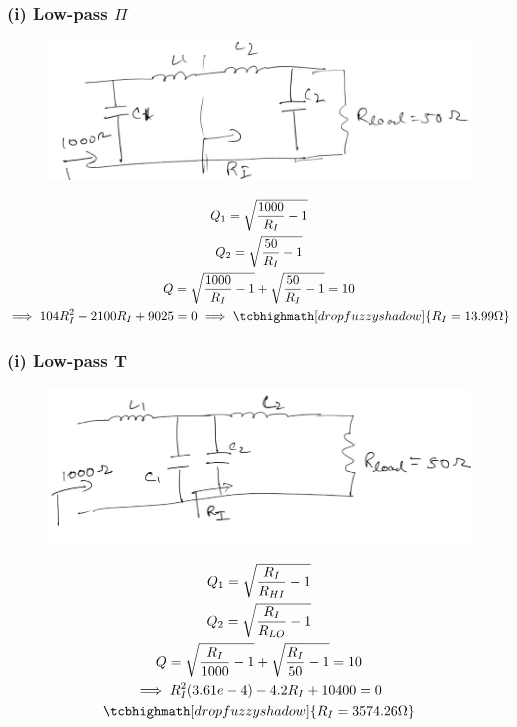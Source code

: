 \documentclass{article}
\begin{document}
\subsubsection*{(i) Low-pass $\Pi$}
\begin{figure}[H]
	\includegraphics[scale=0.4]{./figs/q2_bii.png}
\end{figure}
\begin{gather}
	Q_1 = \sqrt{\frac{1000}{R_{I}}-1}\\
	Q_2 = \sqrt{\frac{50}{R_{I}}-1}\\
	Q = \sqrt{\frac{1000}{R_{I}}-1} + \sqrt{\frac{50}{R_{I}}-1} = 10\\
	\implies 104R_I^2 -2100R_I + 9025 = 0
	\implies \tcbhighmath[drop fuzzy shadow]{R_I = 13.99 \si{\ohm}}
\end{gather}

\subsubsection*{(i) Low-pass T}
\begin{figure}[H]
	\includegraphics[scale=0.4]{./figs/q2_bi.png}
\end{figure}
\begin{gather}
	Q_1 = \sqrt{\frac{R_I}{R_{HI}}-1}\\
	Q_2 = \sqrt{\frac{R_I}{R_{LO}}-1}\\
	Q = \sqrt{\frac{R_I}{1000}-1} + \sqrt{\frac{R_I}{50}-1} = 10\\
	\implies R_I^2(3.61e-4) - 4.2R_I + 10400 = 0\\
	\tcbhighmath[drop fuzzy shadow]{R_I = 3574.26 \si{\ohm}}
\end{gather}
\end{document}
